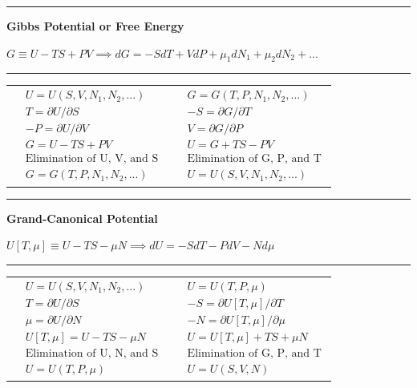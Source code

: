 \begin{center}
    \rule{.8\textwidth}{.5pt}
    
    \textbf{Gibbs Potential or Free Energy}
    
    $G \equiv U - TS + PV \implies dG = -SdT + VdP + \mu_1dN_1 + \mu_2dN_2 + ... $
    \rule{.8\textwidth}{.5pt}
\end{center}
\begin{tabularx}{\textwidth}{X | X}
    {\begin{align*}
        & U = U(S,V,N_1,N_2,...) \\
        & T = \partial U/\partial S \\
        & -P = \partial U/\partial V \\
        & G = U - TS + PV \\
        & \text{Elimination of U, V, and S} \\
        & G = G(T,P,N_1,N_2,...)
    \end{align*}} 
    & 
    {\begin{align*}
        & G=G(T,P,N_1,N_2,...) \\
        & -S = \partial G/\partial T \\
        & V = \partial G/\partial P \\
        & U = G + TS - PV \\
        & \text{Elimination of G, P, and T} \\
        & U = U(S,V,N_1,N_2,...)
    \end{align*}} 
\end{tabularx}
\newpage
\begin{center}
    \rule{.8\textwidth}{.5pt}
    
    \textbf{Grand-Canonical Potential}
    
    $U[T,\mu] \equiv U - TS - \mu N \implies dU = -SdT - PdV - Nd\mu$
    \rule{.8\textwidth}{.5pt}
\end{center}
\begin{tabularx}{\textwidth}{X | X}
    {\begin{align*}
        & U = U(S,V,N_1,N_2,...) \\
        & T = \partial U/\partial S \\
        & \mu = \partial U/\partial N \\
        & U[T,\mu] = U - TS - \mu N \\
        & \text{Elimination of U, N, and S} \\
        & U = U(T,P,\mu)
    \end{align*}} 
    & 
    {\begin{align*}
        & U = U(T,P,\mu) \\
        & -S = \partial U[T,\mu]/\partial T \\
        & -N = \partial U[T,\mu]/\partial \mu \\
        & U = U[T,\mu] + TS + \mu N \\
        & \text{Elimination of G, P, and T} \\
        & U = U(S,V,N)
    \end{align*}} 
\end{tabularx}



